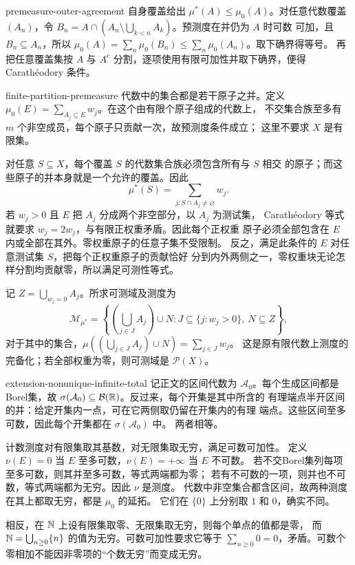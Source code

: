 \begin{solution}{premeasure-outer-agreement}
自身覆盖给出 $\mu^*(A)\le\mu_0(A)$。对任意代数覆盖 $(A_n)$，令
$B_n=A\cap(A_n\setminus\bigcup_{k<n}A_k)$。预测度在并仍为 $A$ 时可数
可加，且 $B_n\subseteq A_n$，所以
$\mu_0(A)=\sum_n\mu_0(B_n)\le\sum_n\mu_0(A_n)$。取下确界得等号。
再把任意覆盖集按 $A$ 与 $A^c$ 分割，逐项使用有限可加性并取下确界，便得
Carathéodory 条件。
\end{solution}

\begin{solution}{finite-partition-premeasure}
代数中的集合都是若干原子之并。定义
$\mu_0(E)=\sum_{A_j\subseteq E}w_j$。在这个由有限个原子组成的代数上，
不交集合族至多有 $m$ 个非空成员，每个原子只贡献一次，故预测度条件成立；
这里不要求 $X$ 是有限集。

对任意 $S\subseteq X$，每个覆盖 $S$ 的代数集合族必须包含所有与 $S$ 相交
的原子；而这些原子的并本身就是一个允许的覆盖。因此
\[
 \mu^*(S)=\sum_{j:S\cap A_j\ne\varnothing}w_j.
\]
若 $w_j>0$ 且 $E$ 把 $A_j$ 分成两个非空部分，以 $A_j$ 为测试集，
Carathéodory 等式就要求 $w_j=2w_j$，与有限正权重矛盾。因此每个正权重
原子必须全部包含在 $E$ 内或全部在其外。零权重原子的任意子集不受限制。
反之，满足此条件的 $E$ 对任意测试集 $S$，把每个正权重原子的贡献恰好
分到内外两侧之一，零权重块无论怎样分割均贡献零，所以满足可测性等式。

记 $Z=\bigcup_{w_j=0}A_j$。所求可测域及测度为
\[
 \mathcal M_{\mu^*}
 =\left\{\left(\bigcup_{j\in J}A_j\right)\cup N:
 J\subseteq\{j:w_j>0\},\ N\subseteq Z\right\},
\]
对于其中的集合，$\mu((\bigcup_{j\in J}A_j)\cup N)=\sum_{j\in J}w_j$。
这是原有限代数上测度的完备化；若全部权重为零，则可测域是 $\mathcal P(X)$。
\end{solution}

\begin{solution}{extension-nonunique-infinite-total}
记正文的区间代数为 $\mathcal A_0$。每个生成区间都是Borel集，故
$\sigma(\mathcal A_0)\subseteq\mathcal B(\mathbb{R})$。反过来，每个开集是其中所含的
有理端点半开区间的并：给定开集内一点，可在它两侧取仍留在开集内的有理
端点。这些区间至多可数，因此每个开集都在 $\sigma(\mathcal A_0)$ 中。
两者相等。

计数测度对有限集取其基数，对无限集取无穷，满足可数可加性。
定义 $\nu(E)=0$ 当 $E$ 至多可数，$\nu(E)=+\infty$ 当 $E$ 不可数。
若不交Borel集列每项至多可数，则其并至多可数，等式两端都为零；
若有不可数的一项，则并也不可数，等式两端都为无穷。因此 $\nu$ 是测度。
代数中非空集合都含区间，故两种测度在其上都取无穷，都是 $\mu_0$ 的延拓。
它们在 $\{0\}$ 上分别取 $1$ 和 $0$，确实不同。

相反，在 $\mathbb{N}$ 上设有限集取零、无限集取无穷，则每个单点的值都是零，
而 $\mathbb{N}=\bigcup_{n\ge0}\{n\}$ 的值为无穷。可数可加性要求它等于
$\sum_{n\ge0}0=0$，矛盾。可数个零相加不能因非零项的“个数无穷”而变成无穷。
\end{solution}

